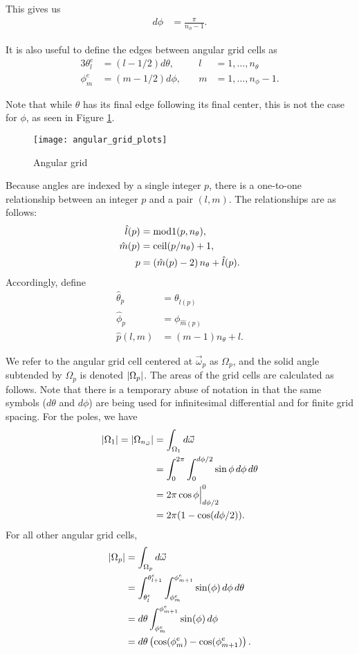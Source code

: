 This gives us
\begin{align*}
  d\phi &= \frac{\pi}{n_\phi-1}.
\end{align*}

It is also useful to define the edges between angular grid cells as
\begin{alignat}{3}
  \theta_l^e &= (l-1/2) d\theta, &\quad l&=1,\ldots,n_\theta \\
  \phi_m^e &= (m-1/2) d\phi, &\quad m&=1,\ldots,n_\phi-1.
\end{alignat}

Note that while $\theta$ has its final edge following its final center, this is
not the case for $\phi$, as seen in Figure \ref{fig:angular_grid_plots}.

\begin{figure}[h]
  \centering
  \texttt{[image: angular\_grid\_plots]}
  \caption{Angular grid}
  \label{fig:angular_grid_plots}
\end{figure}

Because angles are indexed by a single integer $p$, there is a one-to-one relationship between
an integer $p$ and a pair $(l,m)$.
The relationships are as follows:
\begin{align*}
  \hat{l}(p) &= \mbox{mod1}(p, n_\theta), \\
  \hat{m}(p) &= \mbox{ceil}(p/n_\theta) + 1, \\
  p &= \left( \hat{m}(p)-2\right)n_\theta + \hat{l}(p).
\end{align*}
Accordingly, define
\begin{align*}
  \hat{\theta}_p &= \theta_{\hat{l}(p)} \\
  \hat{\phi}_p &= \phi_{\hat{m}(p)} \\
  \hat{p}(l,m) &= (m-1)n_\theta + l.
\end{align*}

We refer to the angular grid cell centered at $\vec{\omega}_p$ as $\Omega_p$, and the solid angle subtended by $\Omega_p$ is denoted $\left| \Omega_p \right|$.
The areas of the grid cells are calculated as follows.
Note that there is a temporary abuse of notation in that the same symbols ($d\theta$ and $d\phi$) are being used for infinitesimal differential and for finite grid spacing.
For the poles, we have
\begin{align*}
  \left| \Omega_1 \right| = \left| \Omega_{n_{\vec{\omega}}} \right| &= \int_{\Omega_1} d{\vec{\omega}} \\
  &= \int_0^{2\pi}\int_0^{d\phi/2} \sin\phi\, d\phi\, d\theta \\
  &= 2\pi \cos\phi \Big|_{d\phi/2}^0 \\
  &= 2\pi(1-\cos(d\phi/2)).
\end{align*}
For all other angular grid cells,
\begin{align*}
  \left| \Omega_p \right| &= \int_{\Omega_p} d{\vec{\omega}} \\
                 &= \int_{\theta_l^e}^{\theta_{l+1}^e}\int_{\phi_m^e}^{\phi_{m+1}^e} \sin(\phi)\, d\phi\, d\theta \\
                 &= d\theta \int_{\phi_m^e}^{\phi_{m+1}^e} \sin(\phi)\, d\phi \\
                 &= d\theta\left( \cos(\phi_m^e)-\cos(\phi_{m+1}^e) \right).
\end{align*}

